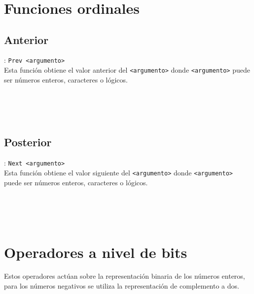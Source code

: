       \begin{fxcode}
         \\
         \\
         \\
      \end{fxcode}
      
   \section{Funciones ordinales}
      
      \subsection*{Anterior}: \texttt{Prev <argumento>}\\
      Esta función obtiene el valor anterior del \texttt{<argumento>} donde \texttt{<argumento>} puede ser números enteros, caracteres o lógicos.
      
      \begin{fxcode}
         \\
         \\
         \\
      \end{fxcode}
      
      \subsection*{Posterior}: \texttt{Next <argumento>}\\
      Esta función obtiene el valor siguiente del \texttt{<argumento>} donde \texttt{<argumento>} puede ser números enteros, caracteres o lógicos.
      
      \begin{fxcode}
         \\
         \\
         \\
      \end{fxcode}
      
   \section{Operadores a nivel de bits}
      Estos operadores actúan sobre la representación binaria de los números enteros, para los números negativos se utiliza la representación de complemento a dos.
      
